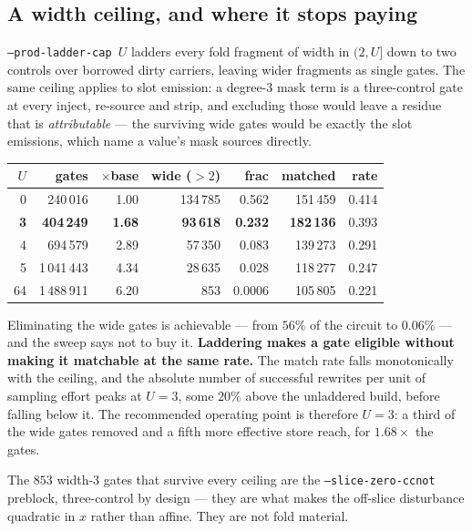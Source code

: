 \documentclass[11pt]{article}
\newcommand{\code}[1]{\texttt{#1}}
\begin{document}
\subsection{A width ceiling, and where it stops paying}

\code{--prod-ladder-cap $U$} ladders every fold fragment of width in $(2, U]$
down to two controls over borrowed dirty carriers, leaving wider fragments as
single gates. The same ceiling applies to slot emission: a degree-3 mask term
is a three-control gate at every inject, re-source and strip, and excluding
those would leave a residue that is \emph{attributable} --- the surviving wide
gates would be exactly the slot emissions, which name a value's mask sources
directly.

\begin{center}
\begin{tabular}{rrrrrrr}
\toprule
$U$ & gates & $\times$base & wide ($>2$) & frac & matched & rate\\
\midrule
0  & 240\,016 & 1.00 & 134\,785 & 0.562 & 151\,459 & 0.414\\
\textbf{3}  & \textbf{404\,249} & \textbf{1.68} & \textbf{93\,618} & \textbf{0.232} & \textbf{182\,136} & 0.393\\
4  & 694\,579 & 2.89 & 57\,350 & 0.083 & 139\,273 & 0.291\\
5  & 1\,041\,443 & 4.34 & 28\,635 & 0.028 & 118\,277 & 0.247\\
64 & 1\,488\,911 & 6.20 & 853 & 0.0006 & 105\,805 & 0.221\\
\bottomrule
\end{tabular}
\end{center}

Eliminating the wide gates is achievable --- from $56\%$ of the circuit to
$0.06\%$ --- and the sweep says not to buy it. \textbf{Laddering makes a gate
eligible without making it matchable at the same rate.} The match rate falls
monotonically with the ceiling, and the absolute number of successful rewrites
per unit of sampling effort peaks at $U{=}3$, some $20\%$ above the unladdered
build, before falling below it. The recommended operating point is therefore
$U{=}3$: a third of the wide gates removed and a fifth more effective store
reach, for $1.68\times$ the gates.

The $853$ width-3 gates that survive every ceiling are the
\code{--slice-zero-ccnot} preblock, three-control by design --- they are what
makes the off-slice disturbance quadratic in $x$ rather than affine. They are
not fold material.
\end{document}
